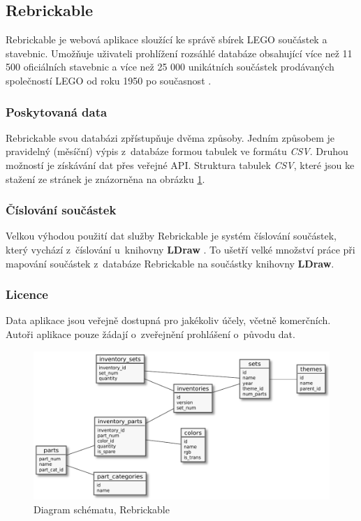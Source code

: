 \subsection{Rebrickable}
  Rebrickable \autocite{rebrickable:homepage} je webová aplikace sloužící ke správě sbírek LEGO součástek a stavebnic. Umožňuje uživateli prohlížení rozsáhlé databáze obsahující více než 11 500 oficiálních stavebnic a více než 25 000 unikátních součástek prodávaných společností LEGO od roku 1950 po současnost \autocite{rebrickable:about}. 

  \subsubsection{Poskytovaná data}  
  Rebrickable svou databázi zpřístupňuje dvěma způsoby. Jedním způsobem je pravidelný (měsíční) výpis z~databáze formou tabulek ve formátu \textit{\gls{CSV}}. Druhou možností je získávání dat přes veřejné \gls{API}. Struktura tabulek \textit{\gls{CSV}}, které jsou ke stažení ze stránek \autocite{rebrickable:download} je znázorněna na obrázku \ref{diagram-rebrickable}.

  \subsubsection{Číslování součástek}
  Velkou výhodou použití dat služby Rebrickable je systém číslování součástek, který vychází z~číslování u~knihovny \textbf{LDraw} \autocite{rebrickable:faq}. To ušetří velké množství práce při mapování součástek z~databáze Rebrickable na součástky knihovny \textbf{LDraw}. 
  
  \subsubsection{Licence}
  Data aplikace jsou veřejně dostupná pro jakékoliv účely, včetně komerčních. Autoři aplikace pouze žádají o~zveřejnění prohlášení o~původu dat. \autocite{rebrickable:terms}
  
  \begin{figure}[htbp]
    \centering
    \includegraphics[width=\textwidth,height=\textheight,keepaspectratio]{pdfs/rebrickable_schema}
    \caption{Diagram schématu, Rebrickable \autocite{rebrickable:download}\label{diagram-rebrickable}}
  \end{figure}

